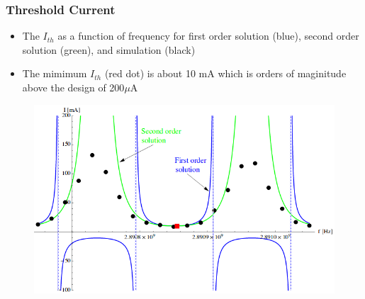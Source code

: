 \documentclass{beamer}
\begin{document}

\begin{frame}
\frametitle{Threshold Current}
\begin{itemize}
\item The $I_{th}$ as a function of frequency for first order solution (blue), second order solution (green), and simulation (black)
\item The mimimum $I_{th}$ (red dot) is about 10 mA which is orders of maginitude above the design of 200$\mu$A
\end{itemize}
\begin{figure}
\includegraphics[width=0.80\linewidth]{figs/threshold.png}
\end{figure}
\end{frame}





\end{document}
